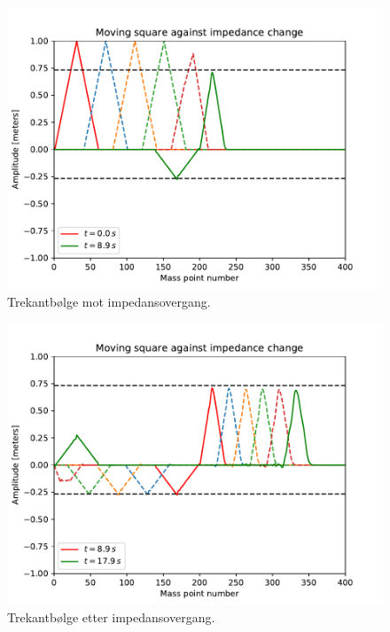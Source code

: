 \documentclass[12p,a4paper]{report}
\begin{document}
\begin{figure}[H]
\centering
\includegraphics[width=\textwidth]{../fig/impedance.pdf}
\caption{Trekantbølge mot impedansovergang.}
\label{fig:imp1}
\end{figure}

\begin{figure}[H]
\centering
\includegraphics[width=\textwidth]{../fig/impedance2.pdf}
\caption{Trekantbølge etter impedansovergang.}
\label{fig:imp2}
\end{figure}
\end{document}

